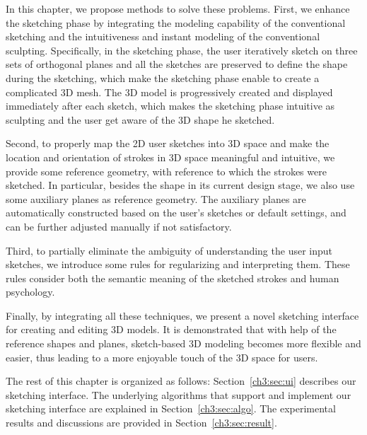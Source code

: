 In this chapter, we propose methods to solve  these problems. First, 
we enhance the sketching phase by integrating the
modeling capability of the conventional sketching and the
intuitiveness and instant modeling of the conventional sculpting.
Specifically, in the sketching phase, the user iteratively sketch on
three sets of orthogonal planes and all the sketches are preserved
to define the shape during the sketching, which make the sketching
phase enable to create a complicated  3D mesh. The 3D model is
progressively created and displayed immediately after each sketch,
which makes the sketching phase intuitive as sculpting and the user
get aware of the 3D shape he sketched.

Second, to properly map the 2D user sketches into 3D space and
make the location and orientation of strokes in 3D space meaningful
and intuitive, we provide some reference geometry, with reference to
which the strokes were sketched. In particular, besides the shape in
its current design stage, we also use some auxiliary planes as
reference geometry. The auxiliary planes are automatically
constructed based on the user's sketches or default settings, and
can be further adjusted manually if not satisfactory.

Third, to partially eliminate the ambiguity of  understanding the
user input sketches, we introduce some rules for regularizing and
interpreting them. These rules consider both the semantic meaning of
the sketched strokes and human psychology.

Finally, by integrating all these techniques, we present a novel
sketching interface for creating and editing 3D models. It is
demonstrated that with help of the reference shapes and planes,
sketch-based 3D modeling becomes more flexible and easier, thus
leading to a more enjoyable touch of the 3D space for users.

The rest of this chapter is organized as follows:
Section~\ref{ch3:sec:ui} describes our sketching interface. The
underlying algorithms that support and implement our sketching
interface are explained in Section~\ref{ch3:sec:algo}. The
experimental results and discussions are provided in
Section~\ref{ch3:sec:result}.

